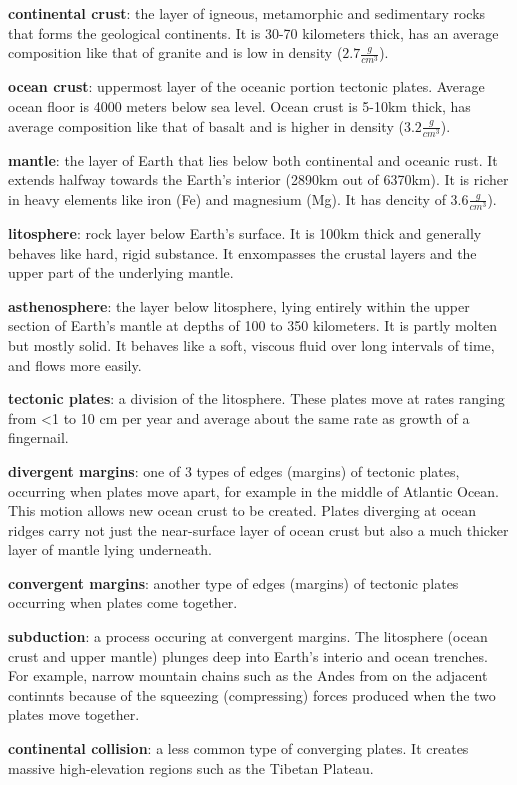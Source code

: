 \textbf{continental crust}: the layer of igneous, metamorphic and sedimentary
rocks that forms the geological continents. It is 30-70 kilometers thick, has
an average composition like that of granite and is low in density
($2.7 \frac{g}{cm^3}$).

\textbf{ocean crust}: uppermost layer of the oceanic portion tectonic plates.
Average ocean floor is 4000 meters below sea level. Ocean crust is 5-10km
thick, has average composition like that of basalt and is higher in density
($3.2 \frac{g}{cm^3}$).

\textbf{mantle}: the layer of Earth that lies below both continental
and oceanic rust. It extends halfway towards the Earth's interior (2890km out
of 6370km). It is richer in heavy elements like iron (Fe) and magnesium (Mg).
It has dencity of $3.6 \frac{g}{cm^3}$).

\textbf{litosphere}: rock layer below Earth's surface. It is 100km thick and
generally behaves like hard, rigid substance. It enxompasses the crustal
layers and the upper part of the underlying mantle.

\textbf{asthenosphere}: the layer below litosphere, lying entirely within the
upper section of Earth's mantle at depths of 100 to 350 kilometers. It is
partly molten but mostly solid. It behaves like a soft, viscous fluid over long
intervals of time, and flows more easily.

\textbf{tectonic plates}: a division of the litosphere. These plates move at
rates ranging from <1 to 10 cm per year and average about the same rate as
growth of a fingernail.

\textbf{divergent margins}: one of 3 types of edges (margins) of tectonic
plates, occurring when plates move apart, for example in the middle of
Atlantic Ocean. This motion allows new ocean crust to be created. Plates
diverging at ocean ridges carry not just the near-surface layer of ocean crust
but also a much thicker layer of mantle lying underneath.

\textbf{convergent margins}: another type of edges (margins) of tectonic plates
occurring when plates come together.

\textbf{subduction}: a process occuring at convergent margins. The litosphere
(ocean crust and upper mantle) plunges deep into Earth's interio and ocean
trenches. For example, narrow mountain chains such as the Andes from on the
adjacent continnts because of the squeezing (compressing) forces produced when
the two plates move together.

\textbf{continental collision}: a less common type of converging plates. It
creates massive high-elevation regions such as the Tibetan Plateau.

